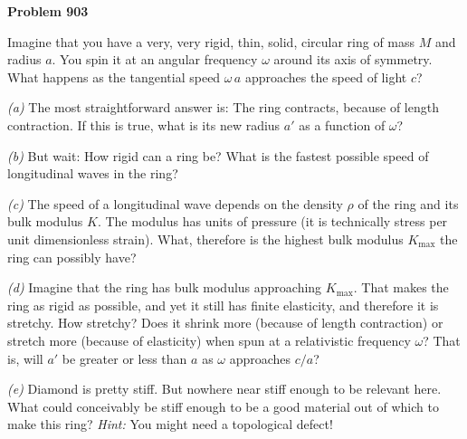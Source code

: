 \documentclass[12pt]{article}
\begin{document}
\begin{pottproblem}
\textbf{Problem 903}

Imagine that you have a very, very rigid, thin, solid, circular ring of mass $M$ and radius $a$.
You spin it at an angular frequency $\omega$ around its axis of symmetry.
What happens as the tangential speed $\omega\,a$ approaches the speed of light $c$?

\textsl{(a)} The most straightforward answer is: The ring contracts, because of length contraction.
If this is true, what is its new radius $a'$ as a function of $\omega$?

\textsl{(b)} But wait: How rigid can a ring be? What is the fastest possible speed of
longitudinal waves in the ring?

\textsl{(c)} The speed of a longitudinal wave depends on the density $\rho$ of the ring and its
bulk modulus $K$. The modulus has units of pressure (it is technically stress per unit dimensionless strain).
What, therefore is the highest bulk modulus $K_\mathrm{max}$ the ring can possibly have?

\textsl{(d)} Imagine that the ring has bulk modulus approaching $K_\mathrm{max}$.
That makes the ring as rigid as possible, and yet it still has finite elasticity, and therefore it is stretchy.
How stretchy? Does it shrink more (because of length contraction) or stretch more (because of elasticity)
when spun at a relativistic frequency $\omega$?
That is, will $a'$ be greater or less than $a$ as $\omega$ approaches $c/a$?

\textsl{(e)} Diamond is pretty stiff. But nowhere near stiff enough to be relevant here.
What could conceivably be stiff enough to be a good material out of which to make this ring?
\textsl{Hint:} You might need a topological defect!

\end{pottproblem}
\end{document}
